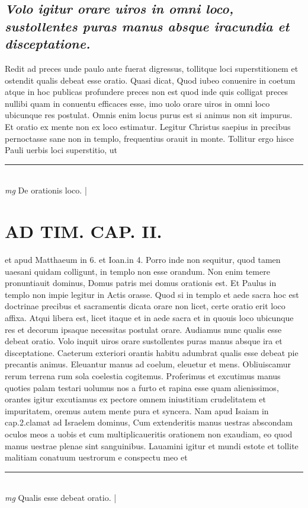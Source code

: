 \documentclass{article}
\begin{document}
\begin{pages}
\subsection*{\textit{Volo igitur orare uiros in omni loco, sustollentes puras manus absque iracundia et disceptatione. }}\pstart Redit ad preces unde paulo ante fuerat digressus, tollitque loci superstitionem et ostendit qualis debeat esse oratio. Quasi dicat, Quod iubeo conuenire in coetum atque in hoc publicas profundere preces non est quod inde quis colligat preces nullibi quam in conuentu efficaces esse, imo uolo orare uiros in omni loco ubicunque res postulat. Omnis enim locus purus est si animus non sit impurus. Et oratio ex mente non ex loco estimatur. Legitur Christus saepius in precibus pernoctasse sane non in templo, frequentius orauit in monte. Tollitur ergo hisce Pauli uerbis loci superstitio, ut  \pend
\vspace{0.5cm}\noindent
\vspace{0.2cm}\rule{1cm}{0.2pt}\\ 
\hspace{0.2cm}\textit{mg}
\footnotesize De orationis loco. 
\normalsize| 
\section*{AD TIM. CAP. II. }
\marginpar{[ p.119 ]}\pstart et apud Matthaeum in 6. et Ioan.in 4. Porro inde non sequitur, quod tamen uaesani quidam colligunt, in templo non esse orandum. Non enim temere pronuntiauit dominus, Domus patris mei domus orationis est. Et Paulus in templo non impie legitur in Actis orasse. Quod si in templo et aede sacra hoc est doctrinae precibus et sacramentis dicata orare non licet, certe oratio erit loco affixa. Atqui libera est, licet itaque et in aede sacra et in quouis loco ubicunque res et decorum ipsaque necessitas postulat orare. Audiamus nunc qualis esse debeat oratio. Volo inquit uiros orare sustollentes puras manus absque ira et disceptatione. Caeterum exteriori orantis habitu adumbrat qualis esse debeat pie precantis animus. Eleuantur manus ad coelum, eleuetur et mens. Obliuiscamur rerum terrena rum sola coelestia cogitemus. Proferimus et excutimus manus quoties palam testari uolumus nos a furto et rapina esse quam alienissimos, orantes igitur excutiamus ex pectore omnem iniustitiam crudelitatem et impuritatem, oremus autem mente pura et syncera. Nam apud Isaiam in cap.2.clamat ad Israelem dominus, Cum extenderitis manus uestras abscondam oculos meos a uobis et cum multiplicaueritis orationem non exaudiam, eo quod manus uestrae plenae sint sanguinibus. Lauamini igitur et mundi estote et tollite malitiam conatuum uestrorum e conspectu meo et  \pend
\vspace{0.5cm}\noindent
\vspace{0.2cm}\rule{1cm}{0.2pt}\\ 
\hspace{0.2cm}\textit{mg}
\footnotesize Qualis esse debeat oratio. 
\normalsize| 

\end{pages}
\end{document}
